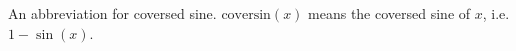 An abbreviation for coversed sine. $\mbox{coversin}(x)$ means the coversed sine of $x$, i.e. $1-\sin(x)$.
  